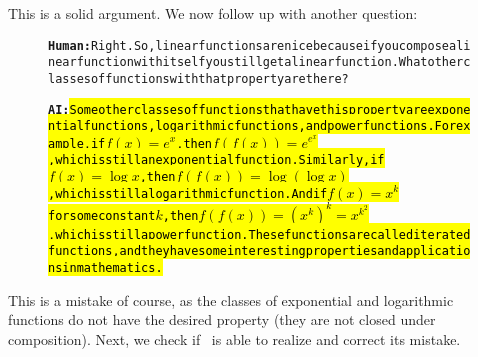 This is a solid argument. We now follow up with another question:
\begin{figure}[H] \begin{AIbox}{{\DV}}\vspace{-5px} \parbox{1\textwidth}{\scriptsize\begin{alltt} 
\textbf{Human:} Right. So, linear functions are nice because if you compose a linear function with itself you still get a linear function. What other classes of functions with that property are there? 

\textbf{AI:} \hl{Some other classes of functions that have this property are exponential functions, logarithmic functions, and power functions. For example, if $f(x) = e^x$, then $f(f(x)) = e^{e^x}$, which is still an exponential function. Similarly, if $f(x) = \log x$, then $f(f(x)) = \log(\log x)$, which is still a logarithmic function. And if $f(x) = x^k$ for some constant $k$, then $f(f(x)) = (x^k)^k = x^{k^2}$, which is still a power function. These functions are called iterated functions, and they have some interesting properties and applications in mathematics.}
\end{alltt}}\vspace{-5px} \end{AIbox} 
\end{figure}
This is a mistake of course, as the classes of exponential and logarithmic functions do not have the desired property (they are not closed under composition). Next, we check if \DV \ is able to realize and correct its mistake.
